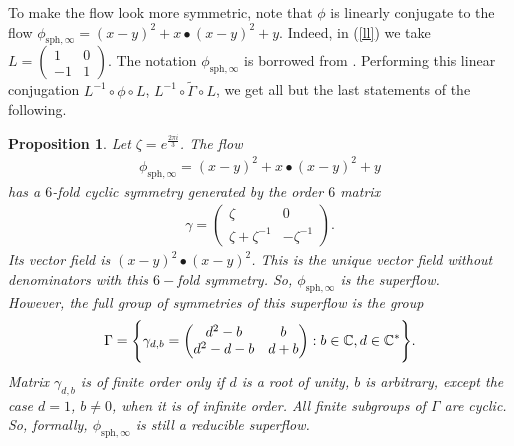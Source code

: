 \documentclass[reqno,12pt]{amsart}
\newtheorem{prop}{Proposition}
\begin{document}
To make the flow look more symmetric, note that $\phi$ is linearly conjugate to the flow $\phi_{\mathrm{sph},\infty}=(x-y)^2+x{\bullet} (x-y)^2+y$. Indeed, in (\ref{ll}) we take $L=\begin{pmatrix}
1 & 0\\
-1 & 1
\end{pmatrix}$. The notation $\phi_{\mathrm{sph},\infty}$ is borrowed from \cite{alkauskas}. Performing this linear conjugation $L^{-1}\circ\phi\circ L$, $L^{-1}\circ\widetilde{\Gamma}\circ L$, we get all but the last statements of the following. 
\begin{prop}Let $\zeta=e^{\frac{2\pi i}{3}}$. The flow
\begin{eqnarray*}
\phi_{\mathrm{sph},\infty}=(x-y)^2+x{\bullet} (x-y)^2+y
\end{eqnarray*}
 has a $6$-fold cyclic symmetry generated by the order $6$ matrix
\begin{eqnarray*}
\gamma=\begin{pmatrix}
\zeta & 0\\
\zeta+\zeta^{-1}&-\zeta^{-1}
\end{pmatrix}.
\end{eqnarray*}
Its vector field is $(x-y)^2{\bullet} (x-y)^2$. This is the unique vector field without denominators with this $6-$fold symmetry. So, $\phi_{\mathrm{sph},\infty}$ is the superflow.\\
 
However, the full group of symmetries of this superflow is the group
\begin{eqnarray*}
\Gamma=\Bigg{\{}\gamma_{d,b}=\begin{pmatrix}
d^2-b & b\\
d^2-d-b & d+b
\end{pmatrix}:b\in\mathbb{C},d\in\mathbb{C}^{*}\Bigg{\}}.
\end{eqnarray*}
Matrix $\gamma_{d,b}$ is of finite order only if $d$ is a root of unity, $b$ is arbitrary, except the case $d=1$, $b\neq 0$, when it is of infinite order. All finite subgroups of $\Gamma$ are cyclic. So, formally, $\phi_{\mathrm{sph}, \infty}$ is still a reducible superflow.  
\end{prop}
\end{document}
